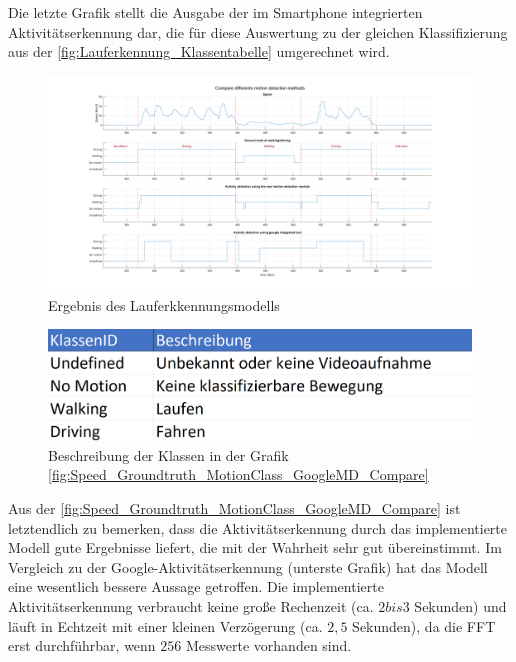Die letzte Grafik stellt die Ausgabe der im Smartphone integrierten Aktivitätserkennung dar, die für diese Auswertung zu der gleichen Klassifizierung aus der \autoref{fig:Lauferkennung_Klassentabelle} umgerechnet wird.

\begin{figure}
	\centering
	\includegraphics[width=\linewidth]{Bilder/Speed_Groundtruth_MotionClass_GoogleMD_Compare.png}
	\caption{Ergebnis des Lauferkkennungsmodells}
	\label{fig:Speed_Groundtruth_MotionClass_GoogleMD_Compare}
\end{figure}

\begin{figure}
	\centering
	\includegraphics[width=0.6\linewidth]{Bilder/Lauferkennung_Klassentabelle.png}
	\caption{Beschreibung der Klassen in der Grafik \autoref{fig:Speed_Groundtruth_MotionClass_GoogleMD_Compare}}
	\label{fig:Lauferkennung_Klassentabelle}
\end{figure}

Aus der \autoref{fig:Speed_Groundtruth_MotionClass_GoogleMD_Compare} ist letztendlich zu bemerken, dass die Aktivitätserkennung durch das implementierte Modell gute Ergebnisse liefert, die mit der Wahrheit sehr gut übereinstimmt. Im Vergleich zu der Google-Aktivitätserkennung (unterste Grafik) hat das Modell eine wesentlich bessere Aussage getroffen. Die implementierte Aktivitätserkennung verbraucht keine große Rechenzeit (ca. $2 bis 3$ Sekunden) und läuft in Echtzeit mit einer kleinen Verzögerung (ca. $2,5$ Sekunden), da die FFT erst durchführbar, wenn $256$ Messwerte vorhanden sind.



